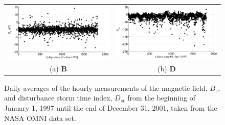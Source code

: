 \begin{figure}[ht]
\begin{tabular}{cc}
\includegraphics[scale=0.48]{SolarExample_Bzdaily.eps} & \includegraphics[scale=0.48]{SolarExample_Ddaily.eps} \\
(a) $\bar{\mathbf{B}}$ & (b) $\bar{\mathbf{D}}$
\end{tabular}
\caption{Daily averages of the hourly measurements of the magnetic field, $B_z$, and disturbance storm time index, $D_{st}$ from the beginning of January 1, 1997 until the end of December 31, 2001, taken from the NASA OMNI data set.}
\label{fig:BzDstDAILYxyplot}
\end{figure}

